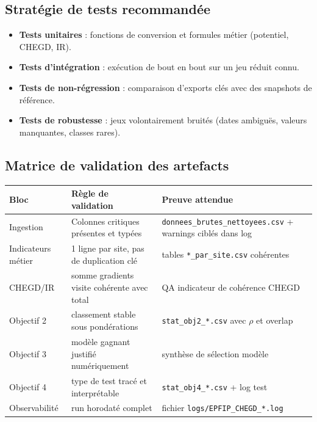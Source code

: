 \documentclass[11pt,a4paper]{article}
\begin{document}
\subsection{Stratégie de tests recommandée}
\begin{itemize}[leftmargin=1.2cm]
  \item \textbf{Tests unitaires} : fonctions de conversion et formules métier (potentiel, CHEGD, IR).
  \item \textbf{Tests d'intégration} : exécution de bout en bout sur un jeu réduit connu.
  \item \textbf{Tests de non-régression} : comparaison d'exports clés avec des snapshots de référence.
  \item \textbf{Tests de robustesse} : jeux volontairement bruités (dates ambiguës, valeurs manquantes, classes rares).
\end{itemize}

\subsection{Matrice de validation des artefacts}
\begin{center}\begin{tabular}{p{}p{}p{}}
\toprule
\textbf{Bloc} & \textbf{Règle de validation} & \textbf{Preuve attendue} \\
\midrule
Ingestion & Colonnes critiques présentes et typées & \texttt{donnees\_brutes\_nettoyees.csv} + warnings ciblés dans log \\
Indicateurs métier & 1 ligne par site, pas de duplication clé & tables \texttt{*\_par\_site.csv} cohérentes \\
CHEGD/IR & somme gradients visite cohérente avec total & QA indicateur de cohérence CHEGD \\
Objectif 2 & classement stable sous pondérations & \texttt{stat\_obj2\_*.csv} avec $\rho$ et overlap \\
Objectif 3 & modèle gagnant justifié numériquement & synthèse de sélection modèle \\
Objectif 4 & type de test tracé et interprétable & \texttt{stat\_obj4\_*.csv} + log test \\
Observabilité & run horodaté complet & fichier \texttt{logs/EPFIP\_CHEGD\_*.log} \\
\bottomrule
\end{tabular}\end{center}
\end{document}
